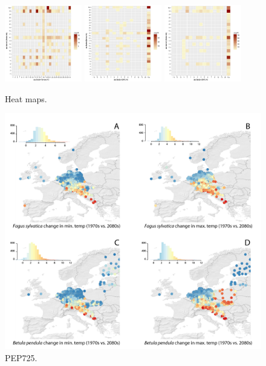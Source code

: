 \documentclass[11pt,letterpaper]{article}
\begin{document}
\begin{figure}[t!]
\centering
\includegraphics[width=0.3\textwidth]{..//..//analyses/limitingcues/figures/heatmapforcexphoto.pdf}
\includegraphics[width=0.3\textwidth]{..//..//analyses/limitingcues/figures/heatmapchillxforce.pdf}
\includegraphics[width=0.3\textwidth]{..//..//analyses/limitingcues/figures/heatmapchillxphoto.pdf}
\caption{Heat maps.}
  \label{fig:heatmaps}
\end{figure}
\clearpage



\begin{figure}[t!]
\centering
\includegraphics[width=1\textwidth]{figures/Fig1_hists pep75 - change temps.png}
\caption{PEP725.}
  \label{fig:pep}
\end{figure}
\clearpage
\end{document}
